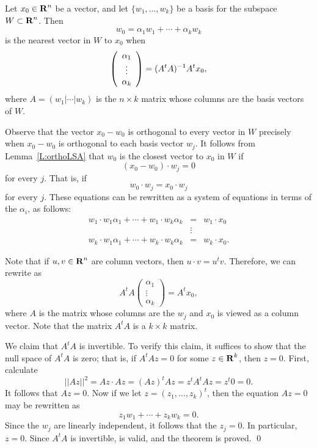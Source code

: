 \begin{thm}  \label{T:nearestvector}
Let $x_0\in\mbox{$\bf{R}$}^n$ be a vector, and let $\{w_1,\ldots,w_k\}$ be a
basis for the subspace $W\subset\mbox{$\bf{R}$}^n$.
Then
\[
w_0 = \alpha_1w_1 + \cdots + \alpha_kw_k
\]
is the nearest vector in $W$ to $x_0$ when
\begin{equation}  \label{E:nearestvector}
\left(\begin{array}{c} \alpha_1 \\ \vdots \\ \alpha_k \end{array}\right) =
(A^tA)^{-1} A^tx_0,
\end{equation}
where $A=(w_1|\cdots|w_k)$ is the $n\times k$ matrix whose columns are the
basis vectors of $W$.
\end{thm}

\proof Observe that the vector $x_0-w_0$ is orthogonal to every vector in $W$
precisely when $x_0-w_0$ is orthogonal to each basis vector $w_j$.  It
follows from Lemma~\ref{L:orthoLSA} that $w_0$ is the closest vector to $x_0$
in $W$ if
\[
(x_0-w_0)\cdot w_j = 0
\]
for every $j$.  That is, if
\[
w_0\cdot w_j = x_0\cdot w_j
\]
for every $j$.  These equations can be rewritten as a system of equations in
terms of the $\alpha_i$, as follows:
\begin{equation}  \label{E:dots}
 \begin{array}{ccc}
w_1\cdot w_1\alpha_1 + \cdots + w_1\cdot w_k\alpha_k & = & w_1\cdot x_0\\
 & \vdots &  \\
w_k\cdot w_1\alpha_1 + \cdots + w_k\cdot w_k\alpha_k & = & w_k\cdot x_0.
\end{array}
\end{equation}

Note that if $u,v\in\mbox{$\bf{R}$}^n$ are column vectors, then $u\cdot v= u^tv$. Therefore,
we can rewrite  as
\[
A^tA \left(\begin{array}{c} \alpha_1\\ \vdots \\ \alpha_k \end{array}\right) =
A^tx_0,
\]
where $A$ is the matrix whose columns are the $w_j$ and $x_0$ is viewed as a
column vector.  Note that the matrix $A^tA$ is a $k\times k$ matrix.

We claim that $A^tA$ is invertible.  To verify this claim, it suffices to
show that the null space
of $A^tA$ is zero; that is, if $A^tA z = 0$ for some
$z\in\mbox{$\bf{R}$}^k$, then $z=0$.  First, calculate
\[
||Az||^2 = Az\cdot Az = (Az)^tAz = z^tA^tAz= z^t0 = 0.
\]
It follows that $Az=0$.  Now if we let $z=(z_1,\ldots,z_k)^t$, then the
equation $Az=0$ may be rewritten as
\[
z_1w_1 + \cdots + z_kw_k = 0.
\]
Since the $w_j$ are linearly independent, it follows that the $z_j=0$.  In
particular, $z=0$.  Since $A^tA$ is invertible,  is
valid, and the theorem is proved. \qed


